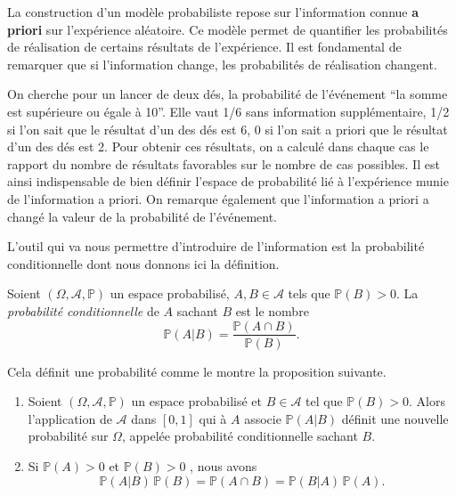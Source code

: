 La construction d'un modèle probabiliste repose sur l'information connue
\textbf{a priori} sur l'expérience aléatoire. Ce modèle permet de
quantifier les probabilités de réalisation de certains résultats de
l'expérience. Il est fondamental de remarquer que si l'information
change, les probabilités de réalisation changent.

\begin{exemple}\label{I-information-a-priori}

On cherche pour un lancer de deux dés, la probabilité de l'événement
``la somme est supérieure ou égale à 10''. Elle vaut 1/6 sans
information supplémentaire, 1/2 si l'on sait que le résultat d'un des
dés est 6, 0 si l'on sait a priori que le résultat d'un des dés est 2.
Pour obtenir ces résultats, on a calculé dans chaque cas le rapport du
nombre de résultats favorables sur le nombre de cas possibles. Il est
ainsi indispensable de bien définir l'espace de probabilité lié à
l'expérience munie de l'information a priori. On remarque également que
l'information a priori a changé la valeur de la probabilité de
l'événement.

L'outil qui va nous permettre d'introduire de l'information est la
probabilité conditionnelle dont nous donnons ici la définition.
\end{exemple}

\begin{definition}\label{I-defprobacond}

Soient \((\Omega, \mathcal{A}, \mathbb{P})\) un espace probabilisé,
\(A, B \in \mathcal{A}\) tels que \(\mathbb{P}(B)>0\). La
\emph{probabilité conditionnelle} de \(A\) sachant \(B\) est le nombre
\begin{equation*}
\mathbb{P}(A|B) = \frac{\mathbb{P}(A\cap B)}{\mathbb{P}(B)}.
\end{equation*}
\end{definition}

Cela définit une probabilité comme le montre la proposition suivante.

\begin{proposition}[{Conséquences}]\label{I-consuxe9quences}

\begin{enumerate}
\def\labelenumi{\arabic{enumi}.}
\tightlist
\item
  Soient \((\Omega, \mathcal{A}, \mathbb{P})\) un espace probabilisé et
  \(B \in \mathcal{A}\) tel que \(\mathbb{P}(B)>0\). Alors l'application
  de \(\mathcal{A}\) dans \([0, 1]\) qui à \(A\) associe
  \(\mathbb{P}(A|B)\) définit une nouvelle probabilité sur \(\Omega\),
  appelée probabilité conditionnelle sachant \(B\).
\item
  Si \(\mathbb{P}(A) > 0\) et \(\mathbb{P}(B) > 0\) , nous avons
  \[\mathbb{P}(A|B)\, \mathbb{P}(B) = \mathbb{P}(A \cap B) = \mathbb{P}(B|A)\, \mathbb{P}(A).\]
\end{enumerate}
\end{proposition}

